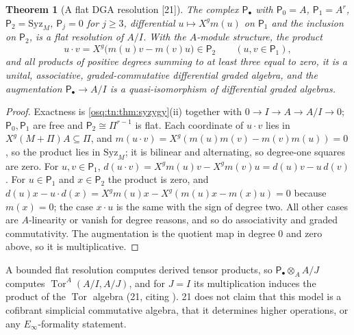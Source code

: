 \documentclass[11pt,letterpaper]{article}
\numberwithin{equation}{section}
\newtheorem{theorem}{Theorem}[section]
\theoremstyle{definition}
\theoremstyle{remark}
\theoremstyle{plain}
\newcommand{\Tor}{\operatorname{Tor}}
\newcommand{\src}[1]{\textup{\textsf{[#1]}}}
\begin{document}
\begin{theorem}[A flat DGA resolution \src{21}]\label{osq:da:thm:dga}
The complex $\mathsf P_\bullet$ with $\mathsf P_0=A$, $\mathsf P_1=A^r$, $\mathsf P_2=\mathrm{Syz}_M$, $\mathsf P_j=0$ for $j\ge3$, differential
$u\mapsto X^gm(u)$ on $\mathsf P_1$ and the inclusion on $\mathsf P_2$, is a flat resolution of $A/I$. With the $A$-module structure, the product
\[
 u\cdot v=X^g\bigl(m(u)v-m(v)u\bigr)\in\mathsf P_2\qquad(u,v\in\mathsf P_1),
\]
and all products of positive degrees summing to at least three equal to zero, it is a unital, associative, graded-commutative
differential graded algebra, and the augmentation $\mathsf P_\bullet\to A/I$ is a quasi-isomorphism of differential graded algebras.
\end{theorem}
\begin{proof}
Exactness is \cref{osq:tn:thm:syzygy}(ii) together with $0\to I\to A\to A/I\to0$; $\mathsf P_0,\mathsf P_1$ are free and $\mathsf P_2\cong\Pi^{r-1}$ is flat. Each
coordinate of $u\cdot v$ lies in $X^g(M+\Pi)A\subseteq\Pi$, and $m(u\cdot v)=X^g(m(u)m(v)-m(v)m(u))=0$, so the product lies in
$\mathrm{Syz}_M$; it is bilinear and alternating, so degree-one squares are zero. For $u,v\in\mathsf P_1$,
$d(u\cdot v)=X^gm(u)v-X^gm(v)u=d(u)v-u\,d(v)$. For $u\in\mathsf P_1$ and $x\in\mathsf P_2$ the product is zero, and $d(u)x-u\cdot d(x)=X^gm(u)x-X^g(m(u)x-m(x)u)=0$
because $m(x)=0$; the case $x\cdot u$ is the same with the sign of degree two. All other cases are $A$-linearity or vanish for degree reasons,
and so do associativity and graded commutativity. The augmentation is the quotient map in degree $0$ and zero above, so it is multiplicative.
\end{proof}

A bounded flat resolution computes derived tensor products, so $\mathsf P_\bullet\otimes_AA/J$ computes $\Tor^A(A/I,A/J)$, and for $J=I$ its
multiplication induces the product of the $\Tor$ algebra (21, citing \cite{StacksDerived}). 21 does not claim that this model is a cofibrant
simplicial commutative algebra, that it determines higher operations, or any $E_\infty$-formality statement.
\end{document}
